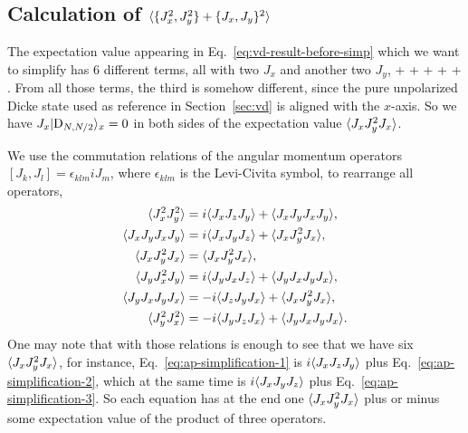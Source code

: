 \subsection{Calculation of $\langle{\{J_x^2,J_y^2\}+\{J_x,J_y\}^2}\rangle$}
\label{app:simplification-of-4th-moments}

The expectation value appearing in Eq.~\eqref{eq:vd-result-before-simp} which we want to simplify has 6 different terms, all with two $J_x$ and another two $J_y$,
\be
   +  + 
  +  +  + .
\ee
From all those terms, the third is somehow different, since the pure unpolarized Dicke state used as reference in Section~\ref{sec:vd} is aligned with the $x$-axis.
So we have $J_x\vert{\ensuremath{\textnormal{D}_{N,N/2}}}\rangle_x=0$ in both sides of the expectation value $\langle{J_xJ_y^2J_x}\rangle$.

We use the commutation relations of the angular momentum operators $[J_k,J_l]=\epsilon_{klm} iJ_m$, where $\epsilon_{klm}$ is the Levi-Civita symbol, to rearrange all operators,
\begin{subequations}
\begin{align}
  \langle{J_x^2J_y^2}\rangle & = i\langle{J_xJ_zJ_y}\rangle+\langle{J_xJ_yJ_xJ_y}\rangle,
  \label{eq:ap-simplification-1} \\
  \langle{J_xJ_yJ_xJ_y}\rangle & = i\langle{J_xJ_yJ_z}\rangle+\langle{J_xJ_y^2J_x}\rangle,
  \label{eq:ap-simplification-2} \\
  \langle{J_xJ_y^2J_x}\rangle & = \langle{J_xJ_y^2J_x}\rangle,
  \label{eq:ap-simplification-3} \\
  \langle{J_yJ_x^2J_y}\rangle & = i\langle{J_yJ_xJ_z}\rangle + \langle{J_yJ_xJ_yJ_x}\rangle,
  \label{eq:ap-simplification-4} \\
  \langle{J_yJ_xJ_yJ_x}\rangle & = -i\langle{J_zJ_yJ_x}\rangle + \langle{J_xJ_y^2J_x}\rangle,
  \label{eq:ap-simplification-5} \\
  \langle{J_y^2J_x^2}\rangle & = -i\langle{J_yJ_zJ_x}\rangle + \langle{J_yJ_xJ_yJ_x}\rangle.
  \label{eq:ap-simplification-6}
\end{align}
\end{subequations}
One may note that with those relations is enough to see that we have six $\langle{J_xJ_y^2J_x}\rangle$, for instance, Eq.~\eqref{eq:ap-simplification-1} is $i\langle{J_xJ_zJ_y}\rangle$ plus Eq.~\eqref{eq:ap-simplification-2}, which at the same time is $i\langle{J_xJ_yJ_z}\rangle$ plus Eq.~\eqref{eq:ap-simplification-3}.
So each equation has at the end one $\langle{J_xJ_y^2J_x}\rangle$ plus or minus some expectation value of the product of three operators.

